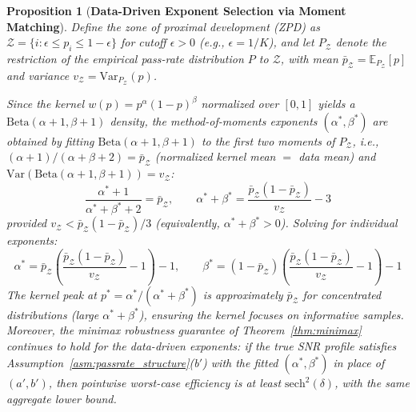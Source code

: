 \documentclass{article}
\newtheorem{proposition}[theorem]{Proposition}
\begin{document}
\begin{proposition}[\textbf{Data-Driven Exponent Selection via Moment Matching}]
\label{prop:exponent_selection}
Define the \emph{zone of proximal development} (ZPD) as $\mathcal{Z} = \{i : \epsilon \leq p_i \leq 1-\epsilon\}$ for cutoff $\epsilon > 0$ (e.g., $\epsilon = 1/K$), and let $P_{\mathcal{Z}}$ denote the restriction of the empirical pass-rate distribution $P$ to $\mathcal{Z}$, with mean $\bar{p}_{\mathcal{Z}} = \mathbb{E}_{P_{\mathcal{Z}}}[p]$ and variance $v_{\mathcal{Z}} = \text{Var}_{P_{\mathcal{Z}}}(p)$.

Since the kernel $w(p) = p^\alpha(1-p)^\beta$ normalized over $[0,1]$ yields a $\mathrm{Beta}(\alpha{+}1,\beta{+}1)$ density, the \emph{method-of-moments} exponents $(\alpha^*, \beta^*)$ are obtained by fitting $\mathrm{Beta}(\alpha{+}1,\beta{+}1)$ to the first two moments of $P_{\mathcal{Z}}$, i.e., $(\alpha{+}1)/(\alpha{+}\beta{+}2) = \bar{p}_{\mathcal{Z}}$ (normalized kernel mean $=$ data mean) and $\mathrm{Var}(\mathrm{Beta}(\alpha{+}1,\beta{+}1)) = v_{\mathcal{Z}}$:
\begin{equation}
  \frac{\alpha^*+1}{\alpha^*+\beta^*+2} = \bar{p}_{\mathcal{Z}}, \qquad \alpha^* + \beta^* = \frac{\bar{p}_{\mathcal{Z}}(1 - \bar{p}_{\mathcal{Z}})}{v_{\mathcal{Z}}} - 3
  \label{eq:moment_match}
\end{equation}
provided $v_{\mathcal{Z}} < \bar{p}_{\mathcal{Z}}(1 - \bar{p}_{\mathcal{Z}})/3$ (equivalently, $\alpha^* + \beta^* > 0$). Solving for individual exponents:
\begin{equation}
  \alpha^* = \bar{p}_{\mathcal{Z}}\!\left(\frac{\bar{p}_{\mathcal{Z}}(1 - \bar{p}_{\mathcal{Z}})}{v_{\mathcal{Z}}} - 1\right) - 1, \qquad \beta^* = (1 - \bar{p}_{\mathcal{Z}})\!\left(\frac{\bar{p}_{\mathcal{Z}}(1 - \bar{p}_{\mathcal{Z}})}{v_{\mathcal{Z}}} - 1\right) - 1
  \label{eq:alpha_beta_closed}
\end{equation}
The kernel peak at $p^* = \alpha^*/(\alpha^*+\beta^*)$ is approximately $\bar{p}_{\mathcal{Z}}$ for concentrated distributions (large $\alpha^*+\beta^*$), ensuring the kernel focuses on informative samples.  Moreover, the minimax robustness guarantee of Theorem~\ref{thm:minimax} continues to hold for the data-driven exponents: if the true SNR profile satisfies Assumption~\ref{asm:passrate_structure}(b$'$) with the fitted $(\alpha^*, \beta^*)$ in place of $(a', b')$, then pointwise worst-case efficiency is at least $\mathrm{sech}^2(\delta)$, with the same aggregate lower bound.
\end{proposition}
\end{document}
